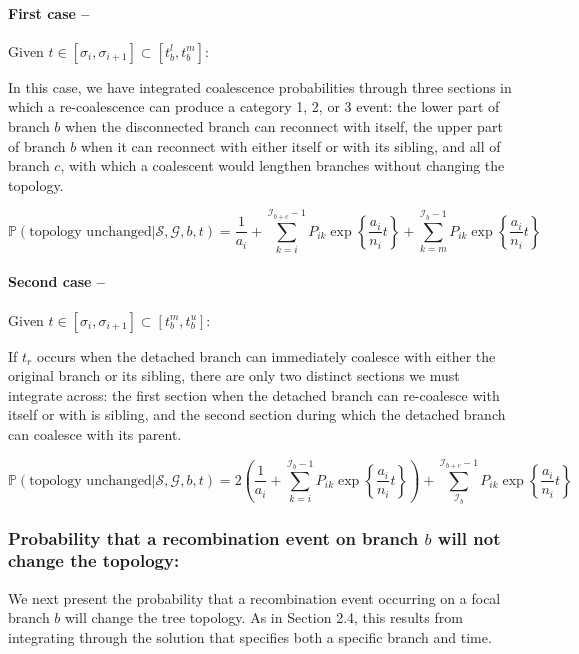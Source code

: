\documentclass[11pt]{article}
\begin{document}
\paragraph{First case --} Given $t \in [\sigma_i, \sigma_{i+1}] \subset [t_b^l,t_{b}^m]$:

In this case, we have integrated coalescence probabilities through three sections in which a re-coalescence can produce a category 1, 2, or 3 event: the lower part of branch $b$ when the disconnected branch can reconnect with itself, the upper part of branch $b$ when it can reconnect with either itself or with its sibling, and all of branch $c$, with which a coalescent would lengthen branches without changing the topology.

\begin{equation}
	\mathbb{P}(\textrm{topology unchanged} | \mathcal{S},\mathcal{G},b,t) = 
	\frac{1}{a_i} + \sum_{k=i}^{\mathcal{I}_{b+c}-1}P_{ik}\exp\left\{\frac{a_i}{n_i}t\right\} + 
	\sum_{k=m}^{\mathcal{I}_b-1}P_{ik}\exp\left\{\frac{a_i}{n_i}t\right\}
\end{equation}

\paragraph{Second case --} Given $t \in [\sigma_i, \sigma_{i+1}] \subset [t_b^m,t_b^u]$:

If $t_r$ occurs when the detached branch can immediately coalesce with either the original branch or its sibling, there are only two distinct sections we must integrate across: the first section when the detached branch can re-coalesce with itself or with is sibling, and the second section during which the detached branch can coalesce with its parent. 

\begin{equation}
	\mathbb{P}(\textrm{topology unchanged} | \mathcal{S},\mathcal{G},b,t) = 
	2\left(\frac{1}{a_i} + \sum_{k=i}^{\mathcal{I}_{b}-1}P_{ik}\exp\left\{\frac{a_i}{n_i}t\right\}\right) + 
	\sum_{\mathcal{I}_b}^{\mathcal{I}_{b+c}-1}P_{ik}\exp\left\{\frac{a_i}{n_i}t\right\}
\end{equation}

\subsubsection{Probability that a recombination event on branch $b$ will not change the topology:}

We next present the probability that a recombination event occurring on a focal branch $b$ will change the tree topology. As in Section 2.4, this results from integrating through the solution that specifies both a specific branch and time. 
\end{document}
